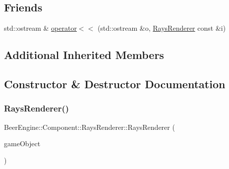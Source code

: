 \subsection*{Friends}
\begin{DoxyCompactItemize}
\item 
std\+::ostream \& \mbox{\hyperlink{class_beer_engine_1_1_component_1_1_rays_renderer_a836618cc9ceb165dceabafb52cbf742f}{operator$<$$<$}} (std\+::ostream \&o, \mbox{\hyperlink{class_beer_engine_1_1_component_1_1_rays_renderer}{Rays\+Renderer}} const \&i)
\end{DoxyCompactItemize}
\subsection*{Additional Inherited Members}


\subsection{Constructor \& Destructor Documentation}
\mbox{\label{class_beer_engine_1_1_component_1_1_rays_renderer_a0d3637f17a8c0c6e159a52a196834bb6}} 
\subsubsection{\texorpdfstring{Rays\+Renderer()}{RaysRenderer()}}
{\footnotesize\ttfamily Beer\+Engine\+::\+Component\+::\+Rays\+Renderer\+::\+Rays\+Renderer (\begin{DoxyParamCaption}\item[{\mbox{\hyperlink{class_beer_engine_1_1_game_object}{Beer\+Engine\+::\+Game\+Object}} $\ast$}]{game\+Object }\end{DoxyParamCaption})}

\mbox{\label{class_beer_engine_1_1_component_1_1_rays_renderer_a23d7ca257ec101eef546b51b0d6a6e36}} 
